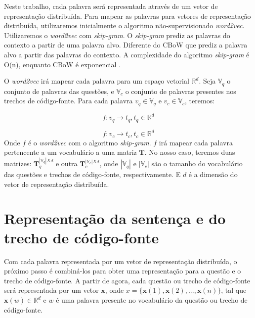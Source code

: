 Neste trabalho, cada palavra será representada através de um vetor de representação distribuída. Para mapear as palavras para vetores de representação distribuída, utilizaremos inicialmente o algoritmo não-supervisionado \textit{word2vec}. Utilizaremos o \textit{word2vec} com \textit{skip-gram}. O \textit{skip-gram} prediz as palavras do contexto a partir de uma palavra alvo. Diferente do CBoW que prediz a palavra alvo a partir das palavras do contexto. A complexidade do algoritmo \textit{skip-gram} é O(n), enquanto CBoW é exponencial . 

O \textit{word2vec} irá mapear cada palavra para um espaço vetorial $\mathbb{R}^{d}$. Seja $\mathbb{V}_{q}$ o conjunto de palavras das questões, e $\mathbb{V}_{c}$ o conjunto de palavras presentes nos trechos de código-fonte. Para cada palavra $v_{q} \in \mathbb{V}_{q}$ e $v_{c} \in \mathbb{V}_c$, teremos:

\begin{equation}
    f: v_{q} \rightarrow t_{q}, t_{q} \in \mathbb{R}^{d}
\end{equation}

\begin{equation}
    f: v_{c} \rightarrow t_{c}, t_{c} \in \mathbb{R}^{d}
\end{equation}
Onde $f$ é o \textit{word2vec} com o algoritmo \textit{skip-gram}. $f$ irá mapear cada palavra pertencente a um vocabulário a uma matriz $\bm{T}$.
No nosso caso, teremos duas matrizes: $\bm{T}_{q}^{|\mathbb{V}_{q}| X d}$ e outra $\bm{T}_{c}^{|\mathbb{V}_{c}| X d}$, onde $|\mathbb{V}_{q}|$ e $|\mathbb{V}_{c}|$ são o tamanho do vocabulário das questões e trechos de código-fonte, respectivamente. E $d$ é a dimensão do vetor de representação distribuída.

\section{Representação da sentença e do trecho de código-fonte}

Com cada palavra representada por um vetor de representação distribuída, o próximo passo é combiná-los para obter uma representação para a questão e o trecho de código-fonte. A partir de agora, cada questão ou trecho de código-fonte será representada por um vetor $\bm{x}$, onde $x = \{ \bm{x}(1), \bm{x}(2), . . ., \bm{x}(n) \}$, tal que $\bm{x}(w) \in \mathbb{R}^{d}$ e $w$ é uma palavra presente no vocabulário da questão ou trecho de código-fonte. 

